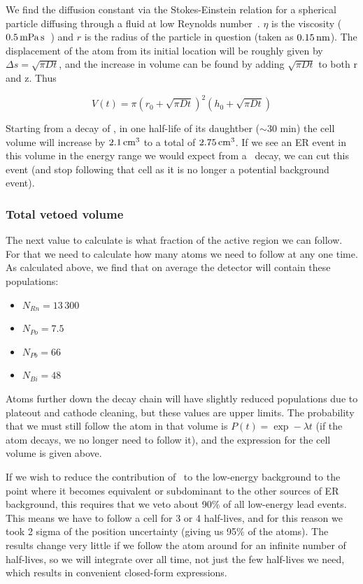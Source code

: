 We find the diffusion constant via the Stokes-Einstein relation for a spherical particle diffusing through a fluid at low Reynolds number~\cite{Sutherland:1905,Einstein:1905,Smoluchowski:1906}. $\eta$ is the viscosity ($0.5\,\mathrm{mPa\,s}$~\cite{Legros:1965}) and $r$ is the radius of the particle in question (taken as $0.15\,\mathrm{nm}$). The displacement of the atom from its initial location will be roughly given by $\Delta s = \sqrt{\pi Dt}$, and the increase in volume can be found by adding $\sqrt{\pi Dt}$ to both r and z. Thus

\begin{equation}
V(t) = \pi(r_0 + \sqrt{\pi Dt})^2(h_0 + \sqrt{\pi Dt})
\end{equation}

Starting from a decay of \Po, in one half-life of its daughtber ($\sim$30 min) the cell volume will increase by $2.1\,\mathrm{cm^3}$ to a total of $2.75\,\mathrm{cm^3}$. If we see an ER event in this volume in the energy range we would expect from a \Pb~decay, we can cut this event (and stop following that cell as it is no longer a potential background event).

\subsubsection{Total vetoed volume}

The next value to calculate is what fraction of the active region we can follow. For that we need to calculate how many atoms we need to follow at any one time. As calculated above, we find that on average the detector will contain these populations:
\begin{itemize}
    \item $N_{Rn} = 13\,300$
    \item $N_{Po} = 7.5$
    \item $N_{Pb} = 66$
    \item $N_{Bi} = 48$
\end{itemize}

Atoms further down the decay chain will have slightly reduced populations due to plateout and cathode cleaning, but these values are upper limits. The probability that we must still follow the atom in that volume is $P(t) = \exp -\lambda t$ (if the atom decays, we no longer need to follow it), and the expression for the cell volume is given above.

If we wish to reduce the contribution of \Pb~to the low-energy background to the point where it becomes equivalent or subdominant to the other sources of ER background, this requires that we veto about 90\% of all low-energy lead events. This means we have to follow a cell for 3 or 4 half-lives, and for this reason we took 2 sigma of the position uncertainty (giving us 95\% of the atoms). The results change very little if we follow the atom around for an infinite number of half-lives, so we will integrate over all time, not just the few half-lives we need, which results in convenient closed-form expressions.

